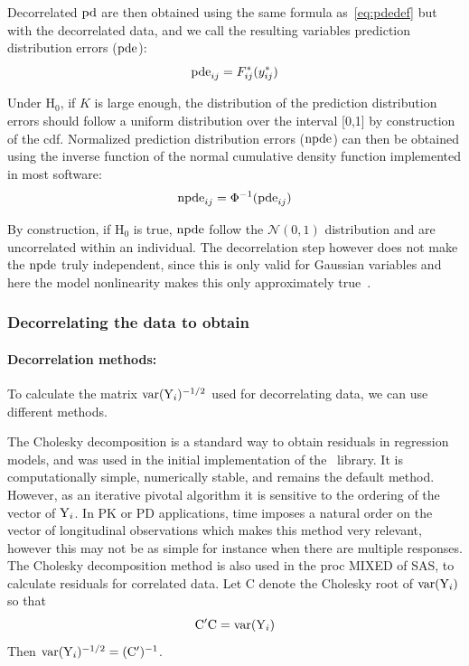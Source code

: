 Decorrelated ${\rm pd}$ are then obtained using the same formula as~\ref{eq:pdedef} but with the decorrelated data, and 
we call the resulting variables prediction distribution errors (${\rm pde}$): 
\begin{equation} 
{\rm pde}_{ij} = F^*_{ij}(y^*_{ij}) 
\end{equation}

Under H$_0$, if $K$ is large enough, the distribution of the prediction distribution errors should follow a uniform 
distribution over the interval [0,1] by construction of the cdf. Normalized prediction distribution errors 
(${\rm npde}$) can then be obtained using the inverse function of the normal cumulative density function implemented in 
most software: 
\begin{equation} 
{\rm npde}_{ij} = \Phi^{-1} ({\rm pde}_{ij}) 
\end{equation}

By construction, if H$_0$ is true, ${\rm npde}$ follow the $\mathcal{N}(0, 1)$ distribution and are uncorrelated within 
an individual. The decorrelation step however does not make the ${\rm npde}$ truly independent, since this is only valid 
for Gaussian variables and here the model nonlinearity makes this only approximately true~\cite{Comets10}.

\subsubsection{Decorrelating the data to obtain \pde} \label{subsec:decorrelation}

\paragraph{Decorrelation methods:} To calculate the matrix $\hbox{var}({\rm Y}_i)^{-1/2}$ used for decorrelating data, we can 
use different methods.

The Cholesky decomposition is a standard way to obtain residuals in regression models, and was used in the initial 
implementation of the \npde~library. It is computationally simple, numerically stable, and remains the default 
method. However, as an iterative pivotal algorithm it is sensitive to the ordering of the vector of ${\rm Y}_i$. In PK 
or PD applications, time imposes a natural order on the vector of longitudinal observations which makes this method 
very relevant, however this may not be as simple for instance when there are multiple responses. The Cholesky 
decomposition method is also used in the proc MIXED of SAS, to calculate residuals for correlated data. Let 
$\mathrm{C}$ denote the Cholesky root of $\hbox{var}({\rm Y}_i)$ so that $$\mathrm{C}'\mathrm{C} = \hbox{var}({\rm Y}_i)$$ Then 
$\hbox{var}({\rm Y}_i)^{-1/2} = (\mathrm{C}')^{-1}$. 

